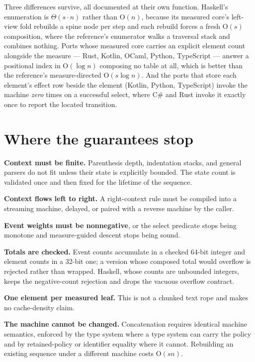 \documentclass[11pt,twoside,openright]{book}
\newcommand{\bigoh}[1]{$\mathrm{O}(#1)$}
\begin{document}
\begin{caveatbox}
Three differences survive, all documented at their own function. Haskell's
enumeration is $\Theta(s \cdot n)$ rather than \bigoh{n}, because its measured
core's left-view fold rebuilds a spine node per step and each rebuild forces a
fresh \bigoh{s} composition, where the reference's enumerator walks a traversal
stack and combines nothing. Ports whose measured core carries an explicit element
count alongside the measure --- Rust, Kotlin, OCaml, Python, TypeScript --- answer
a positional index in \bigoh{\log n} composing no table at all, which is better
than the reference's measure-directed \bigoh{s \log n}. And the ports that store
each element's effect row beside the element (Kotlin, Python, TypeScript) invoke
the machine \emph{zero} times on a successful select, where C\# and Rust invoke it
exactly once to report the located transition.
\end{caveatbox}

\section{Where the guarantees stop}

\begin{caveatbox}
\textbf{Context must be finite.} Parenthesis depth, indentation stacks, and
general parsers do not fit unless their state is explicitly bounded. The state
count is validated once and then fixed for the lifetime of the sequence.

\textbf{Context flows left to right.} A right-context rule must be compiled into a
streaming machine, delayed, or paired with a reverse machine by the caller.

\textbf{Event weights must be nonnegative}, or the select predicate stops being
monotone and measure-guided descent stops being sound.

\textbf{Totals are checked.} Event counts accumulate in a checked 64-bit
integer and element counts in a 32-bit one; a version whose composed total would
overflow is rejected rather than wrapped. Haskell, whose counts are unbounded
integers, keeps the negative-count rejection and drops the vacuous overflow
contract.

\textbf{One element per measured leaf.} This is not a chunked text rope and makes
no cache-density claim.

\textbf{The machine cannot be changed.} Concatenation requires identical machine
semantics, enforced by the type system where a type system can carry the policy
and by retained-policy or identifier equality where it cannot. Rebuilding an
existing sequence under a different machine costs \bigoh{s n}.
\end{caveatbox}
\end{document}
